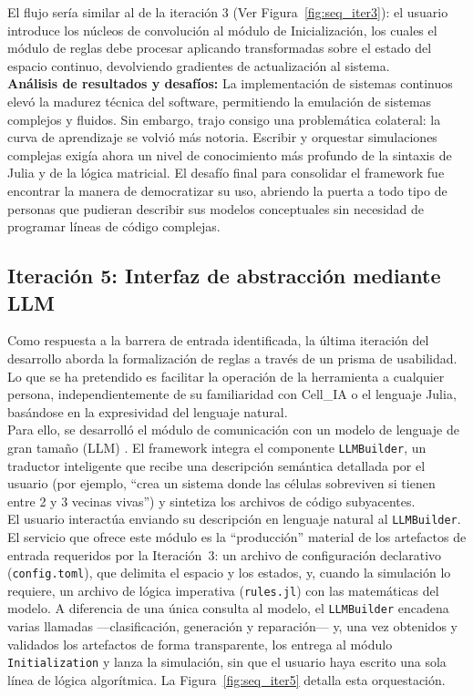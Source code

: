 \documentclass[runningheads]{llncs}
\begin{document}
El flujo sería similar al de la iteración 3 (Ver Figura~\ref{fig:seq_iter3}): el usuario introduce los núcleos de convolución al módulo de Inicialización, los cuales el módulo de reglas debe procesar aplicando transformadas sobre el estado del espacio continuo, devolviendo gradientes de actualización al sistema.\\


\textbf{Análisis de resultados y desafíos:} La implementación de sistemas continuos elevó la madurez técnica del software, permitiendo la emulación de sistemas complejos y fluidos. Sin embargo, trajo consigo una problemática colateral: la curva de aprendizaje se volvió más notoria. Escribir y orquestar simulaciones complejas exigía ahora un nivel de conocimiento más profundo de la sintaxis de Julia y de la lógica matricial. El desafío final para consolidar el framework fue encontrar la manera de democratizar su uso, abriendo la puerta a todo tipo de personas que pudieran describir sus modelos conceptuales sin necesidad de programar líneas de código complejas.

\subsection{Iteración 5: Interfaz de abstracción mediante LLM}
Como respuesta a la barrera de entrada identificada, la última iteración del desarrollo aborda la formalización de reglas a través de un prisma de usabilidad. Lo que se ha pretendido es facilitar la operación de la herramienta a cualquier persona, independientemente de su familiaridad con Cell\_IA o el lenguaje Julia, basándose en la expresividad del lenguaje natural.\\

Para ello, se desarrolló el módulo de comunicación con un modelo de lenguaje de gran tamaño (LLM) \cite{ref_llm, ref_llm2, ref_qwen}. El framework integra el componente \texttt{LLMBuilder}, un traductor inteligente que recibe una descripción semántica detallada por el usuario (por ejemplo, ``crea un sistema donde las células sobreviven si tienen entre 2 y 3 vecinas vivas'') y sintetiza los archivos de código subyacentes.\\

El usuario interactúa enviando su descripción en lenguaje natural al
\texttt{LLMBuilder}. El servicio que ofrece este módulo es la ``producción''
material de los artefactos de entrada requeridos por la Iteración~3: un archivo
de configuración declarativo (\texttt{config.toml}), que delimita el espacio y
los estados, y, cuando la simulación lo requiere, un archivo de lógica
imperativa (\texttt{rules.jl}) con las matemáticas del modelo. A diferencia de
una única consulta al modelo, el \texttt{LLMBuilder} encadena varias llamadas
—clasificación, generación y reparación— y, una vez obtenidos y validados los
artefactos de forma transparente, los entrega al módulo \texttt{Initialization}
y lanza la simulación, sin que el usuario haya escrito una sola línea de lógica
algorítmica. La Figura~\ref{fig:seq_iter5} detalla esta orquestación.
\end{document}
